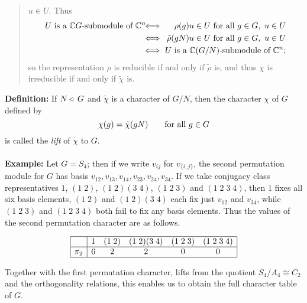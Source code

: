 {\begin{quote}
$u\in U$. Thus
\begin{eqnarray*}
U\hbox{ is a ${\mathbb C}G$-submodule of }{\mathbb C}^n
\!\!\!\!&\iff&\!\!\!\!\rho(g)u\in U\hbox{ for all }g\in G,\ u\in U\\
\!\!\!\!&\iff&\!\!\!\!\tilde\rho(gN)u\in U\hbox{ for all }g\in G,\ u\in U\\
\!\!\!\!&\iff&\!\!\!\! U\hbox{ is a ${\mathbb C}(G/N)$-submodule of }{\mathbb C}^n;
\end{eqnarray*}
so the representation $\rho$ is reducible if and only if
$\tilde\rho$ is, and thus $\chi$ is irreducible if and only if
$\tilde\chi$ is.
\end{quote}
{\bf Definition:} If $N\triangleleft\; G$ and $\tilde\chi$ is a character of
$G/N$, then the character $\chi$ of $G$ defined by
$$\chi(g)=\tilde\chi(gN)\qquad\hbox{for all }g\in G$$
is called the \emph{lift} of $\tilde\chi$ to $G$.
\\
\\
{\bf Example:} Let $G=S_4$; then if we write $v_{ij}$ for
$v_{\{i,j\}}$, the second permutation module for $G$ has basis
$v_{12},v_{13},v_{14},v_{23},v_{24},v_{34}$. If we take conjugacy class
representatives $1$, $(1\;2)$, $(1\;2)(3\;4)$, $(1\;2\;3)$ and $(1\;2\;3\;4)$,
then $1$ fixes all six basis elements, $(1\;2)$ and $(1\;2)(3\;4)$ each fix
just $v_{12}$ and $v_{34}$, while $(1\;2\;3)$ and $(1\;2\;3\;4)$ both fail to
fix any basis elements. Thus the values of the second permutation character
are as follows.

$$
\begin{array}{|c|ccccc|}
\hline
&1&(1\;2)&(1\;2)(3\;4)&(1\;2\;3)&(1\;2\;3\;4)\\
\hline
\pi_2&6&2&2&0&0\\
\hline
\end{array}
$$

 Together with the first permutation character, lifts from the
quotient $S_4/A_4\cong C_2$ and the orthogonality relations, this enables us
to obtain the full character table of $G$.

}

